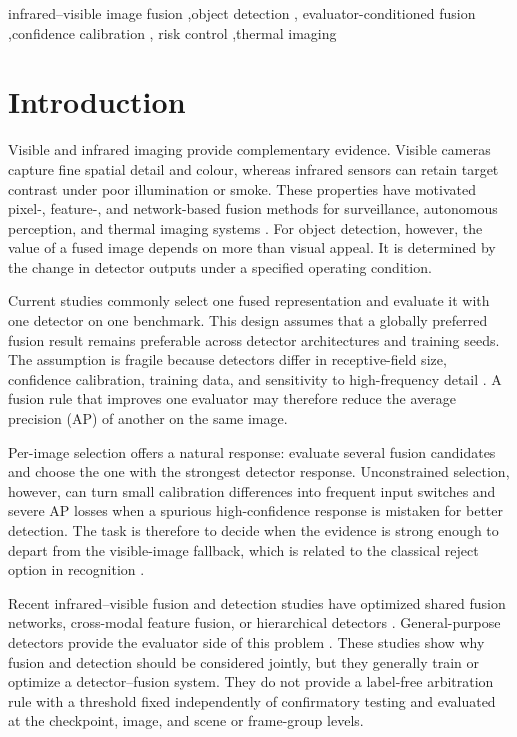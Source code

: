 \documentclass[preprint,11pt]{elsarticle}
\begin{document}
\begin{frontmatter}
\begin{keyword}
infrared--visible image fusion \sep object detection \sep
evaluator-conditioned fusion \sep confidence calibration \sep
risk control \sep thermal imaging
\end{keyword}

\end{frontmatter}

\section{Introduction}

Visible and infrared imaging provide complementary evidence. Visible cameras
capture fine spatial detail and colour, whereas infrared sensors can retain
target contrast under poor illumination or smoke. These properties have
motivated pixel-, feature-, and network-based fusion methods for surveillance,
autonomous perception, and thermal imaging systems
\cite{ma2019survey,mudavath2026review,zhu2017tophat,zhang2020,ma2019fusiongan,li2019densefuse,xu2022u2fusion,li2021rfn,yi2024diffif,yang2025lfdt}.
For object detection, however, the value of a fused image depends on more than
visual appeal. It is determined by the change in detector outputs under a
specified operating condition.

Current studies commonly select one fused representation and evaluate it with
one detector on one benchmark. This design assumes that a globally preferred
fusion result remains preferable across detector architectures and training
seeds. The assumption is fragile because detectors differ in receptive-field
size, confidence calibration, training data, and sensitivity to high-frequency
detail \cite{abdar2021uncertainty,gawlikowski2023uncertainty}. A fusion rule
that improves one evaluator may therefore reduce the average precision (AP) of
another on the same image.

Per-image selection offers a natural response: evaluate several fusion
candidates and choose the one with the strongest detector response.
Unconstrained selection, however, can turn small calibration differences into
frequent input switches and severe AP losses when a spurious high-confidence
response is mistaken for better detection. The task is therefore to decide
when the evidence is strong enough to depart from the visible-image fallback,
which is related to the classical reject option in recognition
\cite{chow1970reject}.

Recent infrared--visible fusion and detection studies have optimized shared
fusion networks, cross-modal feature fusion, or hierarchical detectors
\cite{zhao2025cmifdf,gao2026coifsd,an2026mrtdetr,zhang2026hffn}.
General-purpose detectors provide the evaluator side of this problem
\cite{redmon2016yolo,zhao2024rtdetr}. These studies show why fusion and
detection should be considered jointly, but they generally train or optimize a
detector--fusion system. They do not provide a label-free arbitration rule with
a threshold fixed independently of confirmatory testing and evaluated at the
checkpoint, image, and scene or frame-group levels.
\end{document}
